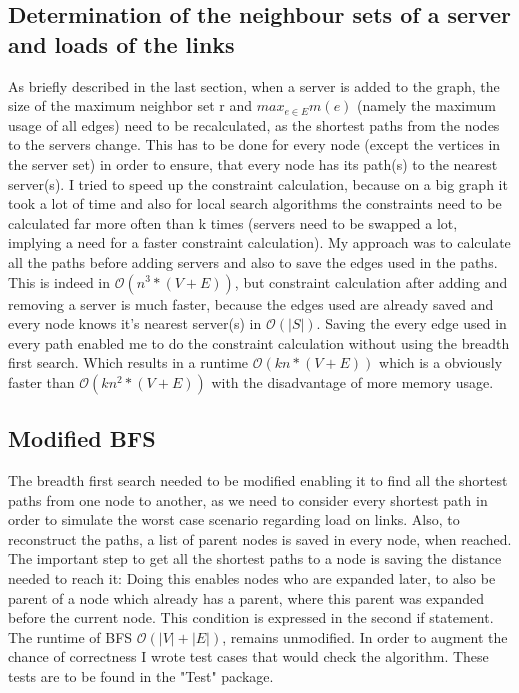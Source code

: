 \documentclass [12pt]{article}
\begin{document}
\subsection{Determination of the neighbour sets of a server and loads of the links}
As briefly described in the last section, when a server is added to the graph, the size of the maximum neighbor set r and
$ max_{e \in E}m(e)$ (namely the maximum usage of all edges) need to be recalculated, as the shortest paths from the nodes 
to the servers change. This has to be done for every node (except the vertices in the server set) in order to ensure, that 
every node has its path(s) to the nearest server(s). I tried to speed up the constraint calculation, 
because on a big graph it took a lot of time and also for local search algorithms the constraints need to be calculated
far more often than k times (servers need to be swapped a lot, implying a need for a faster constraint calculation).
My approach was to calculate all the paths before adding servers and also to save the edges used in the paths.
This is indeed in $\mathcal O(n^{3}*(V+E))$, but constraint calculation after adding and removing a server is much faster,
because the edges used are already saved and every node knows it's nearest server(s) in $\mathcal O(|S|)$. Saving the 
every edge used in every path enabled me to do the constraint calculation without using the breadth first search. Which results
in a runtime $\mathcal O(kn*(V+E))$ which is a obviously faster than $\mathcal O(kn^{2}*(V+E))$ with the disadvantage of more memory usage.

\subsection{Modified BFS}
The breadth first search needed to be modified enabling it to find all the shortest paths 
from one node to another, as we need to consider every shortest path in order to simulate
the worst case scenario regarding load on links. Also, to reconstruct the paths, a list of parent nodes is saved
in every node, when reached. The important step to get all the shortest paths to a node is saving the distance needed to reach it:
Doing this enables nodes who are expanded later, to also be parent of a node which already has a parent, where this parent was
expanded before the current node. This condition is expressed in the second if statement.
The runtime of BFS $\mathcal O(|V| + |E|)$, remains unmodified. In order to augment
the chance of correctness I wrote test cases that would check the algorithm.
These tests are to be found in the "Test" package.
\end{document}
